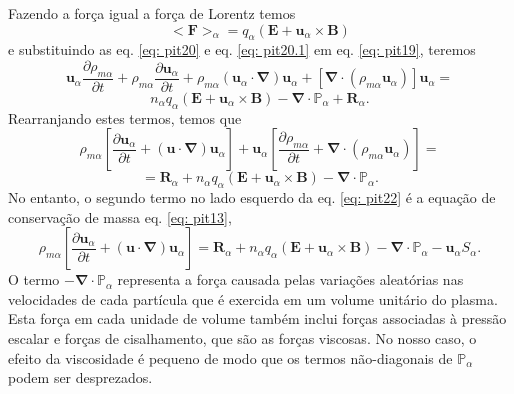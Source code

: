 \documentclass[12pt,oneside,a4paper]{abntex2}
\begin{document}
Fazendo a força igual a força de Lorentz temos 
\begin{equation}
\label{eq: pit20.1}
<\bm{F}>_\alpha = q_\alpha (\bm{E} + \bm{u}_\alpha \times \bm{B})
\end{equation} e substituindo as eq. \ref{eq: pit20} e eq. \ref{eq: pit20.1} em eq. \ref{eq: pit19}, teremos
\begin{equation}
\label{eq: pit21}
 \bm{u}_\alpha \frac{\partial \rho_{m\alpha}}{\partial t} + \rho_{m\alpha} \frac{\partial \bm{u}_\alpha}{\partial t}+ \rho_{m\alpha} (\bm{u}_\alpha \cdot \bm{\nabla})\bm{u}_\alpha+[\bm{\nabla} \cdot (\rho_{m\alpha} \bm{u}_\alpha)]\bm{u}_\alpha  =
\end{equation}
\begin{equation*}
n_\alpha q_\alpha (\bm{E} + \bm{u}_\alpha \times \bm{B})-\bm{\nabla} \cdot \mathbb{P}_\alpha + \bm{R}_\alpha.
\end{equation*}
Rearranjando estes termos, temos que
\begin{equation}
\label{eq: pit22}
\rho_{m\alpha} \left[\frac{\partial \bm{u}_\alpha}{\partial t} + (\bm{u} \cdot \bm{\nabla})\bm{u}_\alpha \right]+ \bm{u}_\alpha \left[ \frac{\partial \rho_{m\alpha}}{\partial t} + \bm{\nabla} \cdot (\rho_{m\alpha} \bm{u}_\alpha)  \right] = 
\end{equation}
\begin{equation*}
=\bm{R}_\alpha +n_\alpha q_\alpha (\bm{E} + \bm{u}_\alpha \times \bm{B})-\bm{\nabla} \cdot \mathbb{P}_\alpha.
\end{equation*}
No entanto, o segundo termo no lado esquerdo da eq. \ref{eq: pit22} é a equação de conservação de massa eq. \ref{eq: pit13}, %
\begin{equation}
\label{eq: pit23}
\rho_{m\alpha} \left[\frac{\partial \bm{u}_\alpha}{\partial t} + (\bm{u} \cdot \bm{\nabla})\bm{u}_\alpha \right] =  \bm{R}_\alpha+n_\alpha q_\alpha (\bm{E} + \bm{u}_\alpha \times \bm{B})-\bm{\nabla} \cdot \mathbb{P}_\alpha-\bm{u}_\alpha S_\alpha.
\end{equation}
O termo $-\bm{\nabla} \cdot \mathbb{P}_\alpha $ representa a força causada pelas variações aleatórias nas velocidades de cada partícula que é exercida em um volume unitário do plasma. 
Esta força em cada unidade de volume também inclui forças associadas à pressão escalar e forças de cisalhamento, que são as forças viscosas. No nosso caso, o efeito da viscosidade é pequeno de modo que os termos não-diagonais de $\mathbb{P}_\alpha$ podem ser desprezados. 
\end{document}
